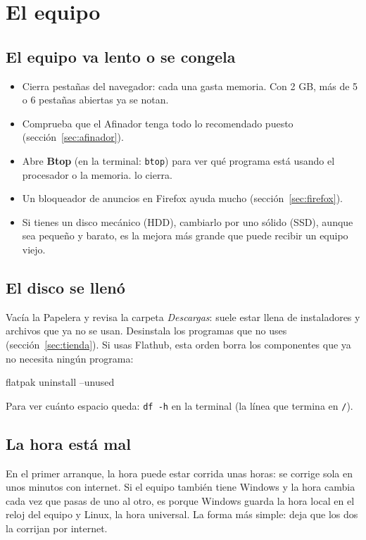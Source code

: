 \section{El equipo}

\subsection{El equipo va lento o se congela}
\begin{itemize}
  \item Cierra pestañas del navegador: cada una gasta memoria. Con 2 GB,
        más de 5 o 6 pestañas abiertas ya se notan.
  \item Comprueba que el Afinador tenga todo lo recomendado puesto
        (sección~\ref{sec:afinador}).
  \item Abre \textbf{Btop} (en la terminal: \texttt{btop}) para ver qué
        programa está usando el procesador o la memoria.  lo cierra.
  \item Un bloqueador de anuncios en Firefox ayuda mucho
        (sección~\ref{sec:firefox}).
  \item Si tienes un disco mecánico (HDD), cambiarlo por uno sólido (SSD),
        aunque sea pequeño y barato, es la mejora más grande que puede
        recibir un equipo viejo.
\end{itemize}

\subsection{El disco se llenó}
Vacía la Papelera y revisa la carpeta \emph{Descargas}: suele estar llena
de instaladores y archivos que ya no se usan. Desinstala los programas que
no uses (sección~\ref{sec:tienda}). Si usas Flathub, esta orden borra los
componentes que ya no necesita ningún programa:
\begin{terminal}
flatpak uninstall --unused
\end{terminal}
Para ver cuánto espacio queda: \texttt{df -h} en la terminal (la línea
que termina en \texttt{/}).

\subsection{La hora está mal}\label{sec:prob-hora}
En el primer arranque, la hora puede estar corrida unas horas: se corrige
sola en unos minutos con internet. Si el equipo también tiene Windows y la
hora cambia cada vez que pasas de uno al otro, es porque Windows guarda la
hora local en el reloj del equipo y Linux, la hora universal. La forma
más simple: deja que los dos la corrijan por internet.


